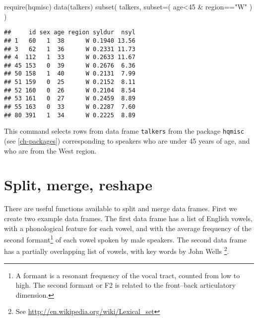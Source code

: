 \documentclass[
]{book}
\newenvironment{Shaded}{\begin{snugshade}}{\end{snugshade}}
\newcommand{\AttributeTok}[1]{\textcolor[rgb]{0.77,0.63,0.00}{#1}}
\newcommand{\DecValTok}[1]{\textcolor[rgb]{0.00,0.00,0.81}{#1}}
\newcommand{\FunctionTok}[1]{\textcolor[rgb]{0.00,0.00,0.00}{#1}}
\newcommand{\NormalTok}[1]{#1}
\newcommand{\SpecialCharTok}[1]{\textcolor[rgb]{0.00,0.00,0.00}{#1}}
\newcommand{\StringTok}[1]{\textcolor[rgb]{0.31,0.60,0.02}{#1}}
\begin{document}
\begin{Shaded}
\begin{Highlighting}[]
\FunctionTok{require}\NormalTok{(hqmisc)}
\FunctionTok{data}\NormalTok{(talkers)}
\FunctionTok{subset}\NormalTok{( talkers, }\AttributeTok{subset=}\NormalTok{( age}\SpecialCharTok{\textless{}}\DecValTok{45} \SpecialCharTok{\&}\NormalTok{ region}\SpecialCharTok{==}\StringTok{"W"}\NormalTok{ ) )}
\end{Highlighting}
\end{Shaded}

\begin{verbatim}
##     id sex age region syldur  nsyl
## 1   60   1  38      W 0.1940 13.56
## 3   62   1  36      W 0.2331 11.73
## 4  112   1  33      W 0.2633 11.67
## 45 153   0  39      W 0.2676  6.36
## 50 158   1  40      W 0.2131  7.99
## 51 159   0  25      W 0.2152  8.11
## 52 160   0  26      W 0.2104  8.54
## 53 161   0  27      W 0.2459  8.89
## 55 163   0  33      W 0.2287  7.60
## 80 391   1  34      W 0.2225  8.89
\end{verbatim}

This command selects rows from data frame \texttt{talkers} from the package \texttt{hqmisc}\\
(see \ref{ch-packages}) corresponding to speakers who are under 45 years of age, and who are from the West region.

\hypertarget{sec:split.merge.reshape}{%
\section{Split, merge, reshape}\label{sec:split.merge.reshape}}

There are useful functions available to split and merge data frames.
First we create two example data frames. The first data frame has a list
of English vowels, with a phonological feature for each vowel, and with the average frequency of the second formant\footnote{A formant is a resonant frequency of the vocal tract, counted from low to high. The second formant or F2 is related to the front--back articulatory dimension.} of each vowel \citep{pete52} spoken by male speakers. The second data frame has a partially overlapping list of vowels, with key words by John Wells \footnote{See \url{http://en.wikipedia.org/wiki/Lexical_set}}.
\end{document}
